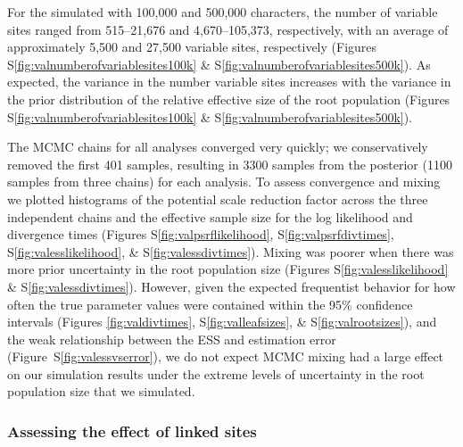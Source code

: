 For the \datasets simulated with 100,000 and 500,000 characters,
the number of variable sites ranged from
515--21,676 
and
4,670--105,373,
respectively, with an average of approximately
5,500
and 
27,500 variable sites, respectively
(Figures S\ref{fig:valnumberofvariablesites100k} \&
S\ref{fig:valnumberofvariablesites500k}).
As expected, the variance in the number variable sites increases with the
variance in the prior distribution of the relative effective size of the root
population
(Figures S\ref{fig:valnumberofvariablesites100k} \&
S\ref{fig:valnumberofvariablesites500k}).

The MCMC chains for all analyses converged very quickly;
we conservatively removed the first 401 samples, resulting in 3300 samples from
the posterior (1100 samples from three chains) for each analysis.
To assess convergence and mixing we plotted histograms of the potential scale
reduction factor across the three independent chains and the effective sample
size for the log likelihood and divergence times
(Figures S\ref{fig:valpsrflikelihood}, S\ref{fig:valpsrfdivtimes},
S\ref{fig:valesslikelihood}, \& S\ref{fig:valessdivtimes}).
Mixing was poorer when there was more prior uncertainty in the root population
size
(Figures S\ref{fig:valesslikelihood} \& S\ref{fig:valessdivtimes}).
However, given the expected frequentist behavior for how often the true
parameter values were contained within the 95\% confidence intervals (Figures
\ref{fig:valdivtimes}, S\ref{fig:valleafsizes}, \& S\ref{fig:valrootsizes}),
and the weak relationship between the ESS and estimation error
(Figure~S\ref{fig:valessvserror}),
we do not expect MCMC mixing had a large effect on our simulation results under
the extreme levels of uncertainty in the root population size that we
simulated.



\subsubsection{Assessing the effect of linked sites}

